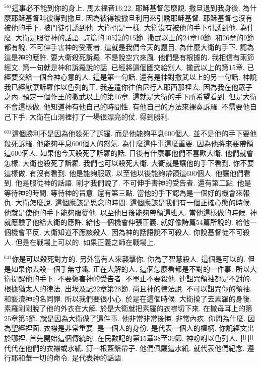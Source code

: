 \documentclass{book}
\begin{document}
$^{561}$這事必不能到你的身上.
馬太福音16:22.
耶穌基督怎麼說.
撒旦退到我身後.
為什麼耶穌基督叫彼得到撒旦.
因為彼得被撒旦利用來引誘耶穌基督.
耶穌基督也沒有被他的手下.
被門徒引誘到他.
大衛也是一樣.
大衛沒有被他的手下引誘到他.
為什麼.
大衛是服從神的話語.
詩篇的105篇的15節.
撒武以上的24章10節.
和26章的9節都有說.
不可伸手害神的受高者.
這就是我們今天的題目.
為什麼大衛的手下.
認為這是神的應許.
要大衛殺死訴羅.
不是說空穴來風.
他們是有根據的.
我相信有兩節經文.
第一句就是神和訴羅說的話.
已經將這個國交給別人.
撒武以上的第15章.
已經要交給一個合神心意的人.
這是第一句話.
還有是神對撒武以上的另一句話.
神說我已經厭棄訴羅作以色列的王.
我差遣你往伯尼行人耶西那裡去.
因為我在他眾子之內.
預定一個作王的撒武以上的第16章.
這就是大衛的手下所希望看到.
但是大衛不會這樣做.
他知道神有他自己的時間性.
有他自己的方法來裸奏訴羅.
不需要他自己下手.
大衛在山洞裡打了一場很漂亮的仗.
得到勝利.

$^{601}$這個勝利不是因為他殺死了訴羅.
而是他能夠平息600個人.
並不是他的手下要他殺死訴羅.
他能夠平息600個人的怒氣.
為什麼這件事這麼重要.
因為他將來要帶領這600個人.
如果他今天殺死了訴羅的話.
日後有什麼事他們不喜歡大衛.
他們就會怎樣.
大衛也殺死了訴羅.
我們也可以殺死大衛.
大衛就是讓他的手下看到.
你不要這樣做.
有沒有看到.
他是能夠服眾.
以至他以後能夠帶領這600個人.
他讓他們看到.
他是服從神的話語.
剛才我們說了.
不可伸手害神的受告者.
還有第二點.
他是等待神的時間.
等待神的旨意.
還有第三點.
當他的手下認為是一個好的機會來報仇.
大衛怎麼說.
這個應該是思念的時間.
這個應該是我們有一個正確心態的時候.
他就是使他的手下能夠服從他.
以至他日後能夠帶領這班人.
當他這樣做的時候.
神就應驗了他給大衛的應許.
給他一個機會伸張正義.
就好像詩篇54篇所說的.
給他一個機會平反.
大衛知道不應該殺人.
因為神的話語說不可殺人.
你說基督徒不可殺人.
但是在戰場上可以的.
如果正義之師在戰場上.

$^{641}$你是可以殺死對方的.
另外當有人來襲擊你.
你為了智慧殺人.
這個是可以的.
但是如果你去殺一個手無寸鐵.
正在大解的人.
這個怎麼看都是不對的一件事.
所以大衛提醒他的手下.
不要傷害神的受告者.
不單止不要殺他.
連詛咒領袖都是不對的.
根據猶太人的律法.
出埃及記22章第28節.
尚且神的律法說.
不可以詛咒你的領袖.
和褻瀆神的名同罪.
所以我們要很小心.
於是在這個時候.
大衛摸了去素羅的身後.
素羅剛剛脫了他的外衣在大解.
於是大衛就把素羅的衣襟切下來.
在撒母耳上的第25章第5節.
就是因為大衛做了這件事.
他非常非常後悔.
非常內疚.
你問為什麼.
因為聖經裡面.
衣襟是非常重要.
是一個人的身份.
是代表一個人的權柄.
你說經文出於哪裡.
首先開始這個傳統的.
在民數記的第15章38至39節.
神吩咐以色列人.
世世代代在他們的衣襟或水紙.
釘一根藍繫帶子.
他們佩戴這水紙.
就代表他們紀念.
遵行耶和華一切的命令.
是代表神的話語.
\end{document}
